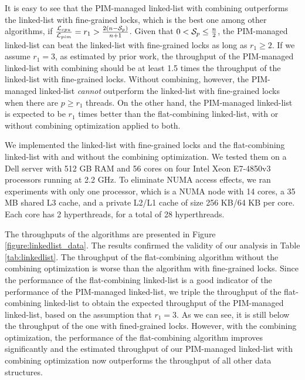 It is easy to see that the PIM-managed linked-list with combining outperforms 
the linked-list with fine-grained locks, which is the best one among other algorithms, 
if ${\mathcal{L}_{cpu} \over \mathcal{L}_{pim}} = r_1 > {2(n - \mathcal{S}_{p})\over n + 1}$.
Given that $0 < \mathcal{S}_{p} \le {n \over 2}$, 
the PIM-managed linked-list can beat the linked-list with fine-grained locks as long as $r_1 \ge 2$. 
If we assume $r_1 = 3$, as estimated by prior work, the throughput of the PIM-managed linked-list with combining should be at least 1.5 times the throughput of the linked-list with fine-grained locks.
Without combining, however, the PIM-managed linked-list \emph{cannot}
outperform the linked-list with fine-grained locks when there are $p \ge r_1$ threads.
On the other hand, the PIM-managed linked-list is expected to be $r_1$ times better than 
the flat-combining linked-list, with or without combining optimization applied to both.  

We implemented the linked-list with fine-grained locks and the flat-combining linked-list 
with and without the combining optimization.
We tested them on a Dell server with 512 GB RAM and 
56 cores on four Intel Xeon E7-4850v3 processors running at 2.2 GHz.
To eliminate NUMA access effects, we ran experiments with only one processor, 
which is a NUMA node with 14 cores, a 35 MB shared L3 cache, 
and a private L2/L1 cache of size 256 KB/64 KB per core. 
Each core has 2 hyperthreads, for a total of 28 hyperthreads. 

The throughputs of the algorithms are presented in Figure \ref{figure:linkedlist_data}.
The results confirmed the validity of our analysis in Table \ref{tab:linkedlist}.
The throughput of the flat-combining algorithm without the combining optimization
is worse than the algorithm with fine-grained locks.
Since the performance of the flat-combining linked-list is a good 
indicator of the performance of the PIM-managed linked-list, 
we triple the throughput of the flat-combining linked-list to obtain the expected throughput 
of the PIM-managed linked-list, based on the assumption that $r_1 = 3$. 
As we can see, it is still below the throughput of the one with fined-grained locks.
However, with the combining optimization, the performance of the flat-combining
algorithm improves significantly and the estimated throughput of our PIM-managed
linked-list with combining optimization now outperforms the throughput of all other data structures.

